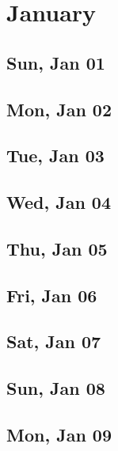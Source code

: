 \chapter{January}
	\section{Sun, Jan 01}
		
		
	\section{Mon, Jan 02}
		
		
	\section{Tue, Jan 03}
		
		
	\section{Wed, Jan 04}
		
		
	\section{Thu, Jan 05}
		
		
	\section{Fri, Jan 06}
		
		
	\section{Sat, Jan 07}
		
		
	\section{Sun, Jan 08}
		
		
	\section{Mon, Jan 09}
		
		

